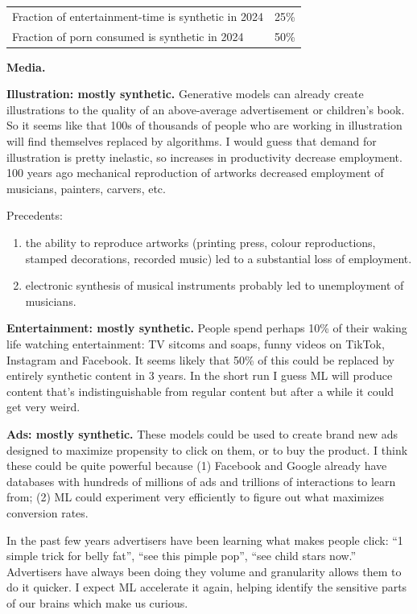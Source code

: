 \documentclass[
  11pt,
  letterpaper,
  DIV=11,
  numbers=noendperiod,
  oneside]{scrartcl}
\begin{document}
\begin{longtable}[]{@{}ll@{}}
\toprule\noalign{}
\endhead
\bottomrule\noalign{}
\endlastfoot
Fraction of entertainment-time is synthetic in 2024 & 25\% \\
Fraction of porn consumed is synthetic in 2024 & 50\% \\
\end{longtable}

\textbf{Media.}

\textbf{Illustration: mostly synthetic.} Generative models can already
create illustrations to the quality of an above-average advertisement or
children's book. So it seems like that 100s of thousands of people who
are working in illustration will find themselves replaced by algorithms.
I would guess that demand for illustration is pretty inelastic, so
increases in productivity decrease employment. 100 years ago mechanical
reproduction of artworks decreased employment of musicians, painters,
carvers, etc.

Precedents:

\begin{enumerate}
\def\labelenumi{(\Alph{enumi})}
\item
  the ability to reproduce artworks (printing press, colour
  reproductions, stamped decorations, recorded music) led to a
  substantial loss of employment.
\item
  electronic synthesis of musical instruments probably led to
  unemployment of musicians.
\end{enumerate}

\textbf{Entertainment: mostly synthetic.} People spend perhaps 10\% of
their waking life watching entertainment: TV sitcoms and soaps, funny
videos on TikTok, Instagram and Facebook. It seems likely that 50\% of
this could be replaced by entirely synthetic content in 3 years. In the
short run I guess ML will produce content that's indistinguishable from
regular content but after a while it could get very weird.

\textbf{Ads: mostly synthetic.} These models could be used to create
brand new ads designed to maximize propensity to click on them, or to
buy the product. I think these could be quite powerful because (1)
Facebook and Google already have databases with hundreds of millions of
ads and trillions of interactions to learn from; (2) ML could experiment
very efficiently to figure out what maximizes conversion rates.

In the past few years advertisers have been learning what makes people
click: ``1 simple trick for belly fat'', ``see this pimple pop'', ``see
child stars now.'' Advertisers have always been doing they volume and
granularity allows them to do it quicker. I expect ML accelerate it
again, helping identify the sensitive parts of our brains which make us
curious.
\end{document}
